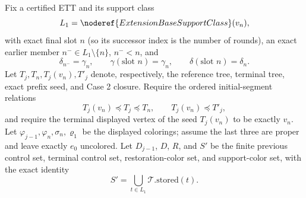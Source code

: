 \begin{lemma}
Fix a certified ETT and its support class
\[
 L_1=\noderef{ExtensionBaseSupportClass}(v_n),
\]
with exact final slot \(n\) (so its successor index is the number of
rounds), an exact earlier member
\(n^-\in L_1\setminus\{n\}\), \(n^-<n\), and
\[
 \delta_{n^-}=\gamma_n,\qquad
 \gamma(\text{slot }n)=\gamma_n,\qquad
 \delta(\text{slot }n)=\delta_n.                              \tag{4}
\]
Let \(T_j,T_n,T_j(v_n),T'_j\) denote, respectively, the reference tree,
terminal tree, exact prefix seed, and Case 2 closure.  Require the ordered
initial-segment relations
\[
 T_j(v_n)\preccurlyeq T_j\preccurlyeq T_n,\qquad
 T_j(v_n)\preccurlyeq T'_j,
\]
and require the terminal displayed vertex of the seed \(T_j(v_n)\) to be
exactly \(v_n\).  Let
\(\varphi_{j-1},\varphi_n,\sigma_n,\varrho_1\) be the displayed
colorings; assume the last three are proper and leave exactly \(e_0\)
uncolored.  Let \(D_{j-1}\), \(D\), \(R\), and \(S'\) be the finite
previous control set, terminal control set, restoration-color set, and
support-color set, with the exact identity
\[
 S'=\bigcup_{t\in L_1}\mathcal T.\mathrm{stored}(t).
\]


\end{lemma}
